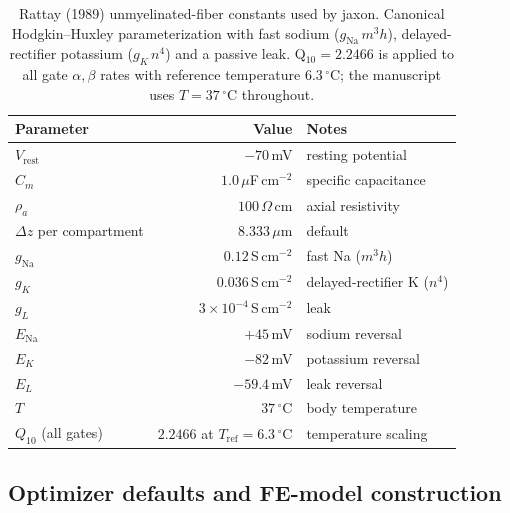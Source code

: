 \begin{table}[h]
  \centering
  \caption{Rattay (1989) unmyelinated-fiber constants used by jaxon.
    Canonical Hodgkin--Huxley parameterization with fast sodium
    ($g_{\mathrm{Na}}\,m^3 h$), delayed-rectifier potassium
    ($g_K\,n^4$) and a passive leak.  Q$_{10} = 2.2466$ is applied to
    all gate $\alpha,\beta$ rates with reference temperature
    $6.3\,^\circ$C; the manuscript uses $T = 37\,^\circ$C throughout.}
  \label{tab:app-rattay}
  \small
  \begin{tabular}{l r p{4.7cm}}
    \toprule
    Parameter & Value & Notes \\
    \midrule
    $V_{\mathrm{rest}}$       & $-70$\,mV   & resting potential \\
    $C_m$                     & $1.0\,\mu$F\,cm$^{-2}$ & specific capacitance \\
    $\rho_a$                  & $100\,\Omega$\,cm       & axial resistivity \\
    $\Delta z$ per compartment & $8.333\,\mu$m          & default \\
    $g_{\mathrm{Na}}$         & $0.12$\,S\,cm$^{-2}$    & fast Na ($m^3 h$) \\
    $g_K$                     & $0.036$\,S\,cm$^{-2}$   & delayed-rectifier K ($n^4$) \\
    $g_L$                     & $3\times 10^{-4}$\,S\,cm$^{-2}$ & leak \\
    $E_{\mathrm{Na}}$         & $+45$\,mV   & sodium reversal \\
    $E_K$                     & $-82$\,mV   & potassium reversal \\
    $E_L$                     & $-59.4$\,mV  & leak reversal \\
    $T$                       & $37\,^\circ$C & body temperature \\
    $Q_{10}$ (all gates)      & $2.2466$ at $T_{\mathrm{ref}}=6.3\,^\circ$C & temperature scaling \\
    \bottomrule
  \end{tabular}
\end{table}

\subsection*{Optimizer defaults and FE-model construction}
\label{sec:app-details}

